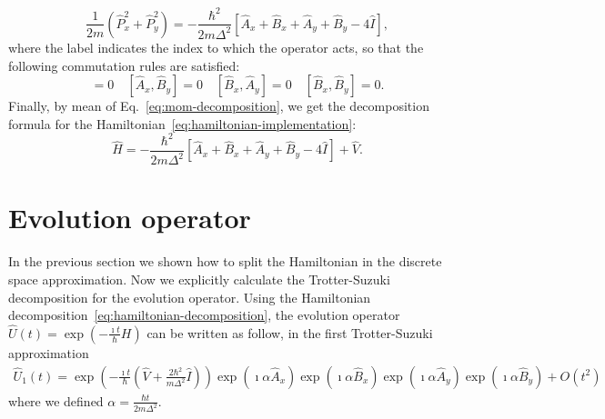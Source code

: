 \begin{equation} \label{eq:mom-decomposition}
\frac{1}{2m} \left( \hat{P}_x^2 + \hat{P}_y^2 \right)= -\frac{\hbar^2}{2m\Delta^2} \left[ \hat{A}_x + \hat{B}_x + \hat{A}_y + \hat{B}_y - 4 \hat{I} \right],
\end{equation}
where the label indicates the index to which the operator acts, so that the following commutation rules are satisfied:
\begin{equation}
[\hat{A}_x, \hat{A}_y] = 0 \quad [\hat{A}_x, \hat{B}_y] = 0 \quad [\hat{B}_x, \hat{A}_y] = 0 \quad [\hat{B}_x, \hat{B}_y] = 0.
\end{equation} 
Finally, by mean of Eq.~\eqref{eq:mom-decomposition}, we get the decomposition formula for the Hamiltonian~\eqref{eq:hamiltonian-implementation}:
\begin{equation} \label{eq:hamiltonian-decomposition}
\hat{H} = -\frac{\hbar^2}{2 m \Delta^2} \left[ \hat{A}_x + \hat{B}_x + \hat{A}_y + \hat{B}_y - 4 \hat{I} \right] + \hat{V}.
\end{equation}

\section{Evolution operator}
In the previous section we shown how to split the Hamiltonian in the discrete space approximation. Now we explicitly calculate the Trotter-Suzuki decomposition for the evolution operator. Using the Hamiltonian decomposition~\eqref{eq:hamiltonian-decomposition}, the evolution operator $\hat{U}(t) = \exp(-\frac{\imath t}{\hbar} H)$ can be written as follow, in the first Trotter-Suzuki approximation
\begin{align}
\hat{U}_1(t) = \exp\left(-\frac{\imath t}{\hbar}\left(\hat{V} + \frac{2 \hbar^2}{m \Delta^2} \hat{I}\right) \right) \exp\left(\imath \alpha \hat{A}_x \right) \exp\left(\imath \alpha \hat{B}_x \right) \exp\left(\imath \alpha \hat{A}_y \right) \exp\left(\imath \alpha \hat{B}_y \right) + O(t^2) \label{eq:1approxTS}
\end{align}
where we defined $\alpha = \frac{\hbar t}{2m\Delta^2}$. 

